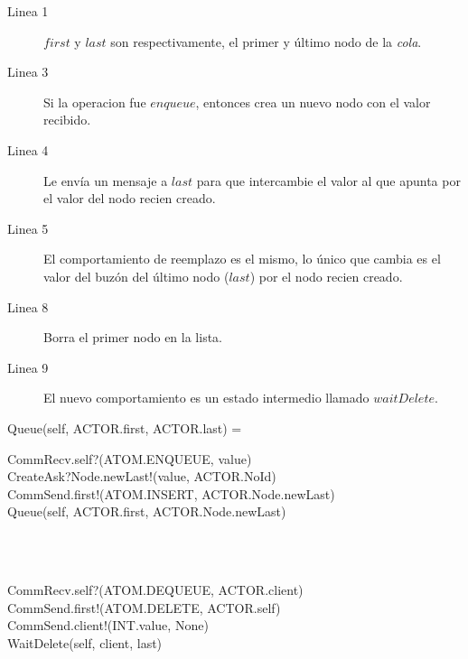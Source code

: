 \begin{description}
 \item [Linea 1] $first$ y $last$ son respectivamente, el primer y último nodo de la \textit{cola}.
 \item [Linea 3] Si la operacion fue $enqueue$, entonces crea un nuevo nodo con el valor recibido. 
 \item [Linea 4] Le envía un mensaje a $last$ para que intercambie el valor al que apunta por el valor del nodo recien creado.
 \item [Linea 5] El comportamiento de reemplazo es el mismo, lo único que cambia es el valor del buzón del último nodo ($last$) por el nodo recien creado.
 \item [Linea 8] Borra el primer nodo en la lista.
 \item [Linea 9] El nuevo comportamiento es un estado intermedio llamado $waitDelete$.
\end{description}


\begin{process}
Queue(self, ACTOR.first, ACTOR.last) = \\ \quad
  \begin{block}
  CommRecv.self?(ATOM.ENQUEUE, value) \then \\
  CreateAsk?Node.newLast!(value, ACTOR.NoId) \then \\
  CommSend.first!(ATOM.INSERT, ACTOR.Node.newLast) \then \\
  Queue(self, ACTOR.first, ACTOR.Node.newLast)
  \end{block} \\

  \Extchoice \\ \quad
  
  \begin{block}
  CommRecv.self?(ATOM.DEQUEUE, ACTOR.client) \then \\
  CommSend.first!(ATOM.DELETE, ACTOR.self) \then \\
  CommSend.client!(INT.value, None) \then \\ 
  WaitDelete(self, client, last)
  \end{block} 
\end{process}


